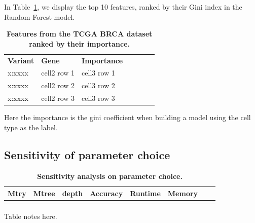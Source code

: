 \documentclass[10pt,a4paper]{article}  %
\newlength\savedwidth
\newcommand\thickhline{\noalign{\global\savedwidth\arrayrulewidth\global\arrayrulewidth 2pt}%
\hline
\noalign{\global\arrayrulewidth\savedwidth}}
\begin{document}
In Table~\ref{table3}, we display the top 10 features, ranked by their Gini index in the Random Forest model.

\begin{table}[!ht]
\centering
\caption{
{\bf Features from the TCGA BRCA dataset ranked by their importance.}}
\begin{tabular}{|l|l|l|l|l|l|l|}
\hline
{\bf Variant} & {\bf Gene} & {\bf Importance}\\ \thickhline
x:xxxx & cell2 row 1 & cell3 row 1\\ \hline
x:xxxx & cell2 row 2 & cell3 row 2\\ \hline
x:xxxx & cell2 row 3 & cell3 row 3\\ \hline
\end{tabular}
\begin{flushleft} Here the importance is the gini coefficient when building a model using the cell type as the label.
\end{flushleft}
\label{table3}
\end{table}

\subsection{Sensitivity of parameter choice}

\begin{table}[!ht]
\caption{
{\bf Sensitivity analysis on parameter choice.}}
\begin{tabular}{|l|l|l|l|l|l|l|l|}
\hline
\bf{Mtry}  & \bf{Mtree} & \bf{depth} & \bf{Accuracy} & \bf{Runtime} & \bf{Memory} \\
\hline
&&&&&\\ \hline
\end{tabular}
\begin{flushleft} 
  Table notes here.
\end{flushleft}
\label{table2}
\end{table}
\end{document}
